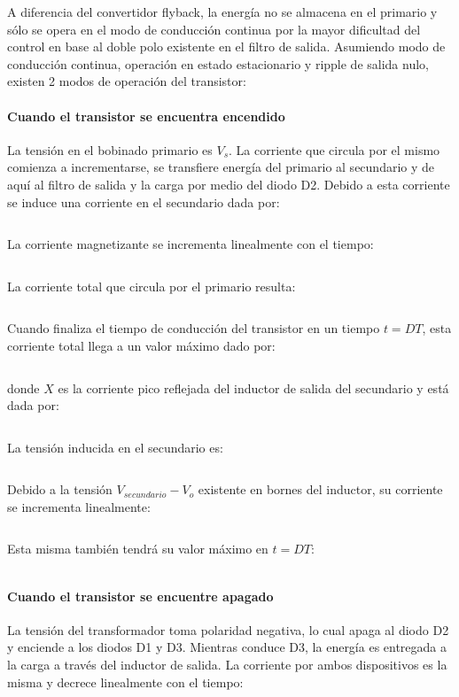 A diferencia del convertidor flyback, la energía no se almacena en el primario y sólo se opera 
en el modo de conducción continua por la mayor dificultad del control en base al doble polo existente en el filtro de salida. 
Asumiendo modo de conducción continua, operación en estado estacionario y ripple de salida nulo, 
existen 2 modos de operación del transistor:

\paragraph{Cuando el transistor se encuentra encendido}
La tensión en el bobinado primario es $V_s$. La corriente que circula por el mismo comienza a incrementarse,
se transfiere energía del primario al secundario y de aquí al filtro de salida y la carga por medio del diodo D2. 
Debido a esta corriente se induce una corriente en el secundario dada por:

$$  $$

La corriente magnetizante se incrementa linealmente con el tiempo:

$$  $$

La corriente total que circula por el primario resulta:

$$  $$

Cuando finaliza el tiempo de conducción del transistor en un tiempo $t=DT$, esta corriente total llega a un valor máximo dado por:

$$  $$

donde $X$ es la corriente pico reflejada del inductor de salida del secundario y está dada por:

$$  $$

La tensión inducida en el secundario es:

$$  $$

Debido a la tensión $V_{secundario}-V_o$ existente en bornes del inductor, su corriente se incrementa linealmente:

$$  $$

Esta misma también tendrá su valor máximo en $t=DT$:

$$  $$

\paragraph{Cuando el transistor se encuentre apagado}
La tensión del transformador toma polaridad negativa, lo cual apaga al diodo D2 y enciende a los diodos D1 y D3. 
Mientras conduce D3, la energía es entregada a la carga a través del inductor de salida. 
La corriente por ambos dispositivos es la misma y decrece linealmente con el tiempo:

